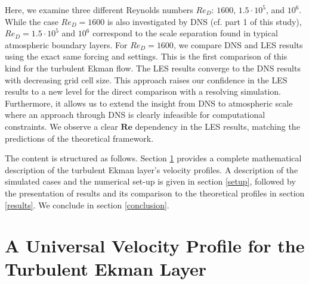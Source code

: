 \documentclass[a4paper,11pt]{article}
\newcommand{\RE}{\mathbf{Re}}
\begin{document}
Here, we examine three different Reynolds numbers $Re_D$: $1600$, $1.5\cdot10^5$, and $10^6$. While the case $Re_D=1600$ is also investigated by DNS (cf. part 1 of this study), $Re_D=1.5 \cdot 10^5$ and $10^6$ correspond to the scale separation found in typical atmospheric boundary layers. For $Re_D=1600$, we compare DNS and LES results using the exact same forcing and settings. This is the first comparison of this kind for the turbulent Ekman flow. The LES results converge to the DNS results with decreasing grid cell size. This approach raises our confidence in the LES results to a new level for the direct comparison with a resolving simulation. Furthermore, it allows us to extend the insight from DNS to atmospheric scale where an approach through DNS is clearly infeasible for computational constraints. We observe a clear $\RE$ dependency in the LES results, matching the predictions of the theoretical framework.

The content is structured as follows. Section \ref{universal_profile} provides a complete mathematical description of the turbulent Ekman layer's velocity profiles. A description of the simulated cases and the numerical set-up is given in section \ref{setup}, followed by the presentation of results and its comparison to the theoretical profiles in section \ref{results}. We conclude in section \ref{conclusion}.

\section{A Universal Velocity Profile for the Turbulent Ekman Layer}
\label{universal_profile}
\end{document}
